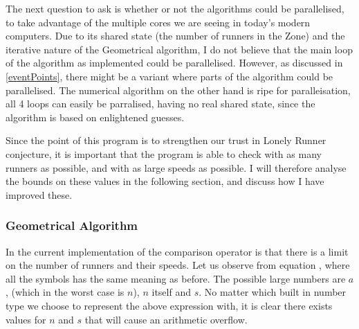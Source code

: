The next question to ask is whether or not the algorithms could be parallelised, to take advantage of the multiple cores we are seeing in today's modern computers. Due to its shared state (the number of runners in the Zone) and the iterative nature of the Geometrical algorithm, I do not believe that the main loop of the algorithm as implemented could be parallelised. However, as discussed in \ref{eventPoints}, there might be a variant where parts of the algorithm could be parallelised. The numerical algorithm on the other hand is ripe for paralleisation, all 4 loops can easily be parralised, having no real shared state, since the algorithm is based on enlightened guesses.

Since the point of this program is to strengthen our trust in Lonely Runner conjecture, it is important that the program is able to check with as many runners as possible, and with as large speeds as possible. I will therefore analyse the bounds on these values in the following section, and discuss how I have improved these.

\subsubsection{Geometrical Algorithm}
In the current implementation of the comparison operator is that there is a limit on the number of runners and their speeds. Let us observe  
 from equation , where all the symbols has the same meaning as before. The possible large numbers are $a$, (which in the worst case is $n$), $n$ itself and $s$. No matter which built in number type we choose to represent the above expression with, it is clear there exists values for $n$ and $s$ that will cause an arithmetic overflow.



